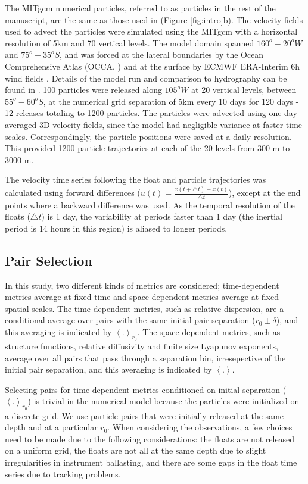 \documentclass[]{ametsoc}
\begin{document}
The MITgcm numerical particles, referred to as particles in the rest of the manuscript, are the same as those used in \cite{lacasce2014} (Figure \ref{fig:intro}b). The velocity fields used to advect the particles were simulated using the MITgcm with a horizontal resolution of 5km and 70 vertical levels. The model domain spanned $160^o - 20^oW$ and  $75^o -35^oS$, and was forced at the lateral boundaries by the Ocean Comprehensive Atlas (OCCA, \cite{forget2010mapping}) and at the surface by ECMWF ERA-Interim 6h wind fields \citep{berrisford2009era}. Details of the model run and comparison to hydrography can be found in \cite{tulloch2014direct}. 100 particles were released along $105^oW$ at 20 vertical levels, between $55^o-60^oS$, at the numerical grid separation of 5km every 10 days for 120 days - 12 releases totaling to 1200 particles. The particles were advected using one-day averaged 3D velocity fields, since the model had negligible variance at faster time scales. Correspondingly, the particle positions were saved at a daily resolution. This provided 1200 particle trajectories at each of the 20 levels from 300 m to 3000 m. 

The velocity time series following the float and particle trajectories was calculated using forward differences ($u(t) = \frac{x(t+\triangle t) - x(t)}{\triangle t}$), except at the end points where a backward difference was used. As the temporal resolution of the floats ($\triangle t$) is 1 day, the variability at periods faster than 1 day (the inertial period is 14 hours in this region) is aliased to longer periods. 

\subsection{Pair Selection}
In this study, two different kinds of metrics are considered; time-dependent metrics average at fixed time and space-dependent metrics average at fixed spatial scales. The time-dependent metrics, such as relative dispersion, are a conditional average over pairs with the same initial pair separation ($r_0 \pm \delta$), and this averaging is indicated by $\left<. \right>_{r_0}$. The space-dependent metrics, such as structure functions, relative diffusivity and finite size Lyapunov exponents, average over all pairs that pass through a separation bin, irresepective of the initial pair separation, and this averaging is indicated by $\left<. \right>$. 

Selecting pairs for time-dependent metrics conditioned on initial separation ($\left<. \right>_{r_0}$) is trivial in the numerical model because the particles were initialized on a discrete grid. We use particle pairs that were initially released at the same depth and at a particular $r_0$. When considering the observations, a few choices need to be made due to the following considerations: the floats are not released on a uniform grid, the floats are not all at the same depth due to slight irregularities in instrument ballasting, and there are some gaps in the float time series due to tracking problems. 
\end{document}
